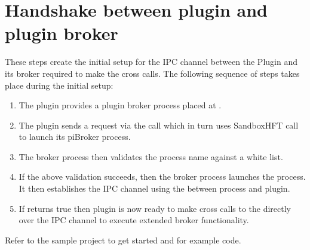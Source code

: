 \documentclass[letterpaper,12pt,english,openany,oneside]{sphinxmanual}
\begin{document}
\section{Handshake between plugin and plugin broker}
\label{\detokenize{SandboxBrokerExt:handshake-between-plugin-and-plugin-broker}}
These steps create the initial setup for the IPC channel between the Plugin and its broker required to make the cross calls. The following sequence of steps takes place during the initial setup:
\begin{enumerate}
%
\item {} 
The plug\sphinxhyphen{}in provides a plug\sphinxhyphen{}in broker process placed at  .

\item {} 
The plug\sphinxhyphen{}in sends a request via the  call which in turn uses SandboxHFT call  to launch its piBroker process.

\item {} 
The broker process then validates the  process name against a white list.

\item {} 
If the above validation succeeds, then the broker process launches the  process. It then establishes the IPC channel using the  between  process and plug\sphinxhyphen{}in.

\item {} 
If  returns true then plug\sphinxhyphen{}in is now ready to make cross calls to the  directly over the IPC channel to execute extended broker functionality.

\end{enumerate}

Refer to the sample project to get started and for example code.
\end{document}
